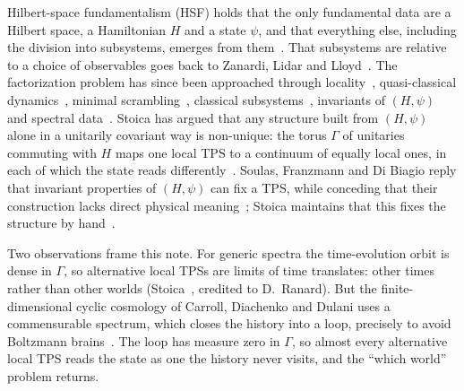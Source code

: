 \documentclass[11pt]{article}
\theoremstyle{definition}
\theoremstyle{remark}
\begin{document}
Hilbert-space fundamentalism (HSF) holds that the only fundamental data are a Hilbert space, a Hamiltonian $H$ and a state $\psi$, and that everything else, including the division into subsystems, emerges from them~\cite{CarrollSingh2021,Stoica2022}. That subsystems are relative to a choice of observables goes back to Zanardi, Lidar and Lloyd~\cite{ZLL2004}. The factorization problem has since been approached through locality~\cite{CPR2019}, quasi-classical dynamics~\cite{CarrollSingh2021}, minimal scrambling~\cite{Zanardi2024}, classical subsystems~\cite{Adil2024}, invariants of $(H,\psi)$~\cite{Soulas2025} and spectral data~\cite{LoizeauSels2024,Cao2026,Kushwaha2026}.
Stoica has argued that any structure built from $(H,\psi)$ alone in a unitarily covariant way is non-unique: the torus $\Gamma$ of unitaries commuting with $H$ maps one local TPS to a continuum of equally local ones, in each of which the state reads differently~\cite{Stoica2022,Stoica2024,Stoica2026}. Soulas, Franzmann and Di Biagio reply that invariant properties of $(H,\psi)$ can fix a TPS, while conceding that their construction lacks direct physical meaning~\cite{Soulas2025}; Stoica maintains that this fixes the structure by hand~\cite{Stoica2026comment}.

Two observations frame this note. For generic spectra the time-evolution orbit is dense in $\Gamma$, so alternative local TPSs are limits of time translates: other times rather than other worlds (Stoica~\cite[Remark~11]{Stoica2022}, credited to D.~Ranard). But the finite-dimensional cyclic cosmology of Carroll, Diachenko and Dulani uses a commensurable spectrum, which closes the history into a loop, precisely to avoid Boltzmann brains~\cite{CDD2026}. The loop has measure zero in $\Gamma$, so almost every alternative local TPS reads the state as one the history never visits, and the ``which world'' problem returns.
\end{document}
